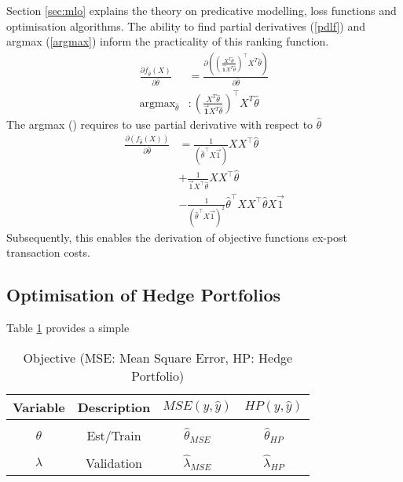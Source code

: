 \documentclass[12pt]{article}
\DeclareMathOperator*{\argmax}{argmax} %
\begin{document}
Section \ref{sec:mlo} explains the theory on predicative modelling, loss functions and optimisation algorithms.
The ability to find partial derivatives (\ref{pdlf}) and argmax (\ref{argmax}) inform the practicality of this ranking function.
\begin{align}
	\frac{\partial f_{\hat{\theta}}(X)}{\partial \hat{\theta}} &= \frac{\partial ((\frac{X^{T} \hat{\theta}}{\vec{\textbf{1}}X^{T} \hat{\theta}})^\top X^{T} \hat{\theta})}{\partial \hat{\theta}} \label{pdlf}\\
	\argmax_{\hat{\theta}} &: (\frac{X^{T} \hat{\theta}}{\vec{\textbf{1}}X^{T} \hat{\theta}})^\top X^{T} \hat{\theta} \label{argmax}
\end{align}
The argmax (\label{argmax}) requires to use partial derivative with respect to $\hat{\theta}$
\begin{align}
	\frac{\partial (f_{\hat{\theta}}(X))}{\partial \hat{\theta}}  &= \frac{1}{(\hat{\theta}^\top X \vec{1})} X X^\top \hat{\theta}\\
	&+\frac{1}{\vec{1}X^\top \hat{\theta}} XX^\top \hat{\theta}\\
	&-\frac{1}{(\hat{\theta}^\top X \vec{1})^{2}} \hat{\theta}^\top XX^\top \hat{\theta} X \vec{1}
\end{align}
Subsequently, this enables the derivation of objective functions ex-post transaction costs.
\subsection{Optimisation of Hedge Portfolios}
Table \ref{hpt} provides a simple 
	\begin{table}[H]
		\centering
		\begin{tabular}{||c|c|c|c||}
			\hline
			Variable & Description & $ MSE(y,\hat{y}) $ & $ HP(y,\hat{y}) $\\ [0.5ex]
			\hline
			&&&\\
			$\theta$ & Est/Train& $ \hat{\theta}_{MSE}$& $ \hat{\theta}_{HP}$ \\ [0.5ex]
			\hline
			&&&\\
			$\lambda$ & Validation & $\hat{\lambda}_{MSE}$ & $\hat{\lambda}_{HP}$\\ [1.0ex]
			\hline
		\end{tabular}
	\caption{Objective (MSE: Mean Square Error, HP: Hedge Portfolio)}
	\label{hpt}
\end{table}
\newpage
\end{document}
